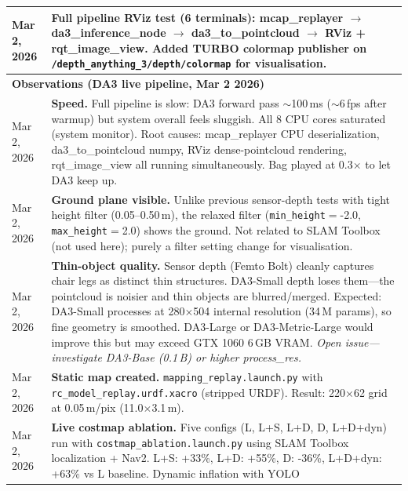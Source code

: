 \documentclass[11pt,a4paper]{article}
\begin{document}
\begin{longtable}{lp{10cm}}
Mar 2, 2026 & Full pipeline RViz test (6 terminals): mcap\_replayer $\to$
              da3\_inference\_node $\to$ da3\_to\_pointcloud $\to$ RViz +
              rqt\_image\_view.  Added TURBO colormap publisher on
              \texttt{/depth\_anything\_3/depth/colormap} for visualisation. \\
\midrule
\multicolumn{2}{l}{\textbf{Observations (DA3 live pipeline, Mar 2 2026)}} \\
\midrule
Mar 2, 2026 & \textbf{Speed.} Full pipeline is slow: DA3 forward pass
              $\sim$100\,ms ($\sim$6\,fps after warmup) but system overall
              feels sluggish.  All 8 CPU cores saturated (system monitor).
              Root causes: mcap\_replayer CPU deserialization, da3\_to\_pointcloud
              numpy, RViz dense-pointcloud rendering, rqt\_image\_view all
              running simultaneously.  Bag played at 0.3$\times$ to let
              DA3 keep up. \\
Mar 2, 2026 & \textbf{Ground plane visible.} Unlike previous sensor-depth
              tests with tight height filter (0.05--0.50\,m), the relaxed
              filter (\texttt{min\_height}$=$-2.0, \texttt{max\_height}$=$2.0)
              shows the ground.  Not related to SLAM Toolbox (not used here);
              purely a filter setting change for visualisation. \\
Mar 2, 2026 & \textbf{Thin-object quality.}  Sensor depth (Femto Bolt) cleanly
              captures chair legs as distinct thin structures.  DA3-Small
              depth loses them---the pointcloud is noisier and thin objects
              are blurred/merged.  Expected: DA3-Small processes at
              280$\times$504 internal resolution (34\,M params), so fine
              geometry is smoothed.  DA3-Large or DA3-Metric-Large would
              improve this but may exceed GTX 1060 6\,GB VRAM.
              \textit{Open issue---investigate DA3-Base (0.1\,B) or
              higher process\_res.} \\
Mar 2, 2026 & \textbf{Static map created.} \texttt{mapping\_replay.launch.py}
              with \texttt{rc\_model\_replay.urdf.xacro} (stripped URDF).
              Result: 220$\times$62 grid at 0.05\,m/pix (11.0$\times$3.1\,m). \\
Mar 2, 2026 & \textbf{Live costmap ablation.} Five configs (L, L+S, L+D, D, L+D+dyn)
              run with \texttt{costmap\_ablation.launch.py} using SLAM Toolbox
              localization + Nav2.  L+S: +33\%, L+D: +55\%, D: -36\%,
              L+D+dyn: +63\% vs L baseline.  Dynamic inflation with YOLO

\end{longtable}
\end{document}
